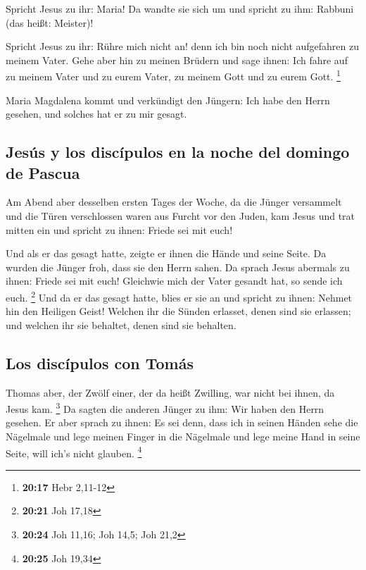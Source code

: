  Spricht Jesus zu ihr: Maria! Da wandte sie sich um und
spricht zu ihm: Rabbuni (das heißt: Meister)!

 Spricht Jesus zu ihr: Rühre mich nicht an! denn ich bin
noch nicht aufgefahren zu meinem Vater. Gehe aber hin zu meinen Brüdern
und sage ihnen: Ich fahre auf zu meinem Vater und zu eurem Vater, zu
meinem Gott und zu eurem Gott. \footnote{\textbf{20:17} Hebr 2,11-12}

 Maria Magdalena kommt und verkündigt den Jüngern: Ich
habe den Herrn gesehen, und solches hat er zu mir gesagt.

\hypertarget{jesuxfas-y-los-discuxedpulos-en-la-noche-del-domingo-de-pascua}{%
\subsection{Jesús y los discípulos en la noche del domingo de
Pascua}\label{jesuxfas-y-los-discuxedpulos-en-la-noche-del-domingo-de-pascua}}

 Am Abend aber desselben ersten Tages der Woche, da die
Jünger versammelt und die Türen verschlossen waren aus Furcht vor den
Juden, kam Jesus und trat mitten ein und spricht zu ihnen: Friede sei
mit euch!

 Und als er das gesagt hatte, zeigte er ihnen die Hände
und seine Seite. Da wurden die Jünger froh, dass sie den Herrn sahen.
 Da sprach Jesus abermals zu ihnen: Friede sei mit euch!
Gleichwie mich der Vater gesandt hat, so sende ich euch. \footnote{\textbf{20:21}
  Joh 17,18}  Und da er das gesagt hatte, blies er sie an
und spricht zu ihnen: Nehmet hin den Heiligen Geist! 
Welchen ihr die Sünden erlasset, denen sind sie erlassen; und welchen
ihr sie behaltet, denen sind sie behalten.

\hypertarget{los-discuxedpulos-con-tomuxe1s}{%
\subsection{Los discípulos con
Tomás}\label{los-discuxedpulos-con-tomuxe1s}}

 Thomas aber, der Zwölf einer, der da heißt Zwilling, war
nicht bei ihnen, da Jesus kam. \footnote{\textbf{20:24} Joh 11,16; Joh
  14,5; Joh 21,2}  Da sagten die anderen Jünger zu ihm:
Wir haben den Herrn gesehen. Er aber sprach zu ihnen: Es sei denn, dass
ich in seinen Händen sehe die Nägelmale und lege meinen Finger in die
Nägelmale und lege meine Hand in seine Seite, will ich's nicht glauben.
\footnote{\textbf{20:25} Joh 19,34}

